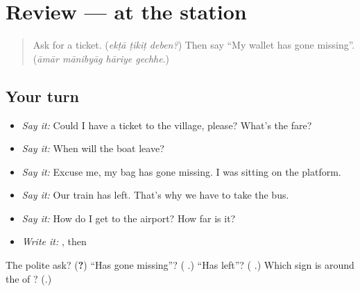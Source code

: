 \section[(review)]{Review — at the station}

\label{lesson:BN-R271-at-the-station}



\begin{quote}
Ask for a ticket. (\emph{ekṭā ṭikiṭ deben?}) Then say \textquotedblleft{}My wallet has gone missing\textquotedblright{}. (\emph{āmār mānibyāg hāriye gechhe}.)
\end{quote}

\subsection*{Your turn}
\begin{itemize}
\raggedright
  \item \emph{Say it:} Could I have a ticket to the village, please? What's the fare?
  \item \emph{Say it:} When will the boat leave?
  \item \emph{Say it:} Excuse me, my bag has gone missing. I was sitting on the platform.
  \item \emph{Say it:} Our train has left. That's why we have to take the bus.
  \item \emph{Say it:} How do I get to the airport? How far is it?
  \item \emph{Write it:} \textbf{}, then \textbf{}
\end{itemize}

\begin{tcolorbox}[breakable,colback=teal!4,colframe=teal!35!black,title={Before you move on}]
The polite ask? (\textbf{?}) \textquotedblleft{}Has gone missing\textquotedblright{}? (\textbf{ }.) \textquotedblleft{}Has left\textquotedblright{}? (\textbf{ }.) Which sign is around the \textbf{} of \textbf{}? (\textbf{}.)
\end{tcolorbox}
